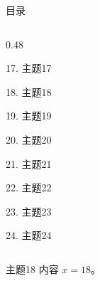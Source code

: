 \documentclass[aspectratio=169,10pt,fontset=fandol]{ctexbeamer}
\begin{document}
\begin{frame}[t,fragile]{目录}
\begin{columns}[T,onlytextwidth]
\begin{column}{0.48\textwidth}
{\color{black}\small 17. 主题17\par}\vspace{0.22em}
{\color{blue}\small 18. 主题18\par}\vspace{0.22em}
{\color{gray!40}\small 19. 主题19\par}\vspace{0.22em}
{\color{gray!40}\small 20. 主题20\par}\vspace{0.22em}
{\color{gray!40}\small 21. 主题21\par}\vspace{0.22em}
{\color{gray!40}\small 22. 主题22\par}\vspace{0.22em}
{\color{gray!40}\small 23. 主题23\par}\vspace{0.22em}
{\color{gray!40}\small 24. 主题24\par}\vspace{0.22em}
\end{column}
\end{columns}
\end{frame}
\begin{frame}[t,fragile]{主题18}
\normalsize
{\normalsize
内容 $x=18$。
}
\end{frame}
\end{document}
